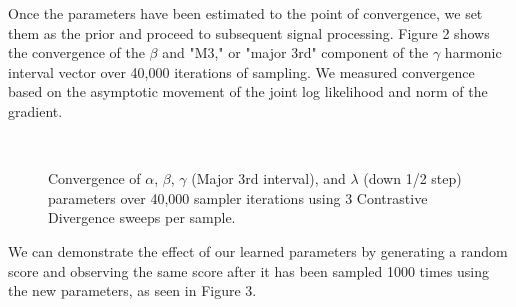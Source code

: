 \documentclass{article}
\begin{document}
Once the parameters have been estimated to the point of convergence, we set them as the prior and proceed to subsequent signal processing.  Figure 2 shows the convergence of the $\beta$ and "M3," or "major 3rd" component of the $\gamma$ harmonic interval vector over 40,000 iterations of sampling.  We measured convergence based on the asymptotic movement of the joint log likelihood and norm of the gradient.

\begin{figure}
\mbox{
\quad
{}\quad
{}\quad
{}
}
\caption{Convergence of $\alpha$, $\beta$, $\gamma$ (Major 3rd interval), and $\lambda$ (down 1/2 step) parameters over 40,000 sampler iterations using 3 Contrastive Divergence sweeps per sample.}
\label{fig-all}
\end{figure}

We can demonstrate the effect of our learned parameters by generating a random score and observing the same score after it has been sampled 1000 times using the new parameters, as seen in Figure 3.
\end{document}
